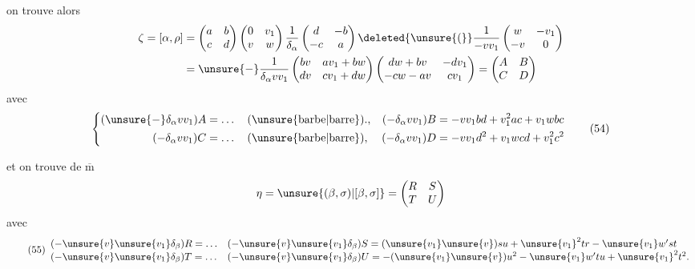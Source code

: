 on trouve alors
\[
\begin{aligned}
\zeta=[\alpha,\rho]
&=\begin{pmatrix}a&b\\c&d\end{pmatrix}
\begin{pmatrix}0&v_1\\v&w\end{pmatrix}
\frac1{\delta_\alpha}\begin{pmatrix}d&-b\\-c&a\end{pmatrix}
\deleted{\unsure{(}}\frac1{-vv_1}\begin{pmatrix}w&-v_1\\-v&0\end{pmatrix}\\
&=\unsure{-}\frac1{\delta_\alpha vv_1}
\begin{pmatrix}bv&av_1+bw\\dv&cv_1+dw\end{pmatrix}
\begin{pmatrix}dw+bv&-dv_1\\-cw-av&cv_1\end{pmatrix}
=\begin{pmatrix}A&B\\C&D\end{pmatrix}
\end{aligned}
\]
avec
\[
\left\{\begin{aligned}
(\unsure{-}\delta_\alpha vv_1)A&=\ldots\quad\text{(\unsure{barbe|barre}).},
&(-\delta_\alpha vv_1)B&=-vv_1bd+v_1^2ac+v_1wbc\\
(-\delta_\alpha vv_1)C&=\ldots\quad\text{(\unsure{barbe|barre})},
&(-\delta_\alpha vv_1)D&=-vv_1d^2+v_1wcd+v_1^2c^2
\end{aligned}\right. \tag{54}
\]


et on trouve de $\overline{\mathrm m}$
\[
\eta=\unsure{(\beta,\sigma)|[\beta,\sigma]}=
\begin{pmatrix}R&S\\T&U\end{pmatrix}
\]
avec
\[
\tag{55}
\begin{array}{ll}
(-\unsure{v}\unsure{v_1}\delta_\beta)R=\ldots
&(-\unsure{v}\unsure{v_1}\delta_\beta)S
 =(\unsure{v_1}\unsure{v})su+\unsure{v_1}^{2}tr-\unsure{v_1}w'st\\
(-\unsure{v}\unsure{v_1}\delta_\beta)T=\ldots
&(-\unsure{v}\unsure{v_1}\delta_\beta)U
 =-(\unsure{v_1}\unsure{v})u^2-\unsure{v_1}w'tu+\unsure{v_1}^{2}t^2.
\end{array}
\]

